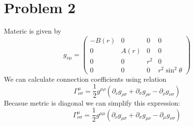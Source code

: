 \section*{Problem 2}

Materic is given by
%
\begin{equation}
    g_{\nu\mu} =
    \begin{pmatrix}
        -B(r) & 0    & 0   & 0               \\
        0     & A(r) & 0   & 0               \\
        0     & 0    & r^2 & 0               \\
        0     & 0    & 0   & r^2\sin^2\theta
    \end{pmatrix}
\end{equation}
%
We can calculate connection coefficients using relation
%
\begin{equation}
    \Gamma^\mu_{\nu\sigma} =
    \frac{1}{2} g^{\mu\rho} \left(
    \partial_\nu g_{\rho\sigma} +
    \partial_\sigma g_{\rho\nu} -
    \partial_\rho g_{\nu\sigma}\right)
\end{equation}
%
Becasue metric is diagonal we can simplify this expression:
%
\begin{equation}
    \Gamma^\mu_{\nu\sigma} =
    \frac{1}{2} g^{\mu\mu} \left(
    \partial_\nu g_{\mu\sigma} +
    \partial_\sigma g_{\mu\nu} -
    \partial_\mu g_{\nu\sigma}\right)
\end{equation}
%
